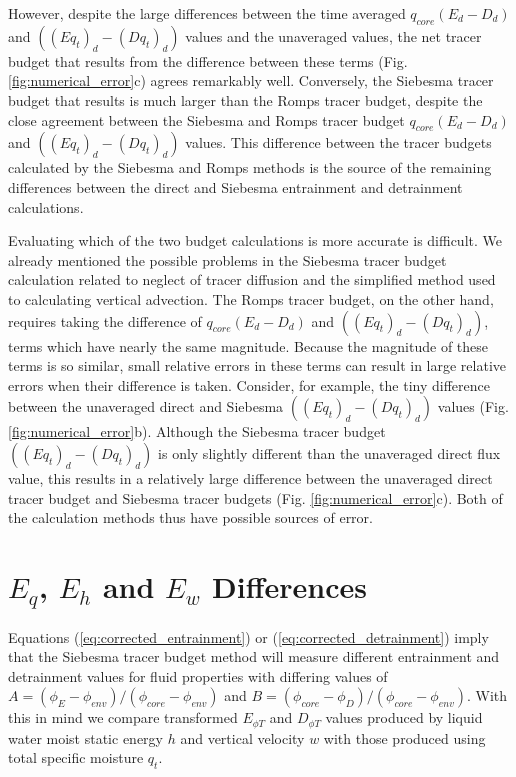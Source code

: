 \documentclass[12pt]{article}
\begin{document}
However, despite the large differences between the time averaged 
$q_{core}(E_d - D_d)$ and $((Eq_t)_d - (Dq_t)_d)$ values and the unaveraged
values, the net tracer budget that results from the difference
between these terms (Fig. \ref{fig:numerical_error}c) agrees remarkably 
well.  Conversely, the Siebesma tracer budget that results is much larger 
than the Romps tracer budget, despite the close agreement between the 
Siebesma and Romps tracer budget $q_{core}(E_d - D_d)$ and 
$((Eq_t)_d - (Dq_t)_d)$ values.  This difference between the tracer budgets
calculated by the Siebesma and Romps methods is the source of the remaining
differences between the direct and Siebesma entrainment and detrainment
calculations.

Evaluating which of the two budget calculations is more accurate is difficult.
We already mentioned the possible problems in the Siebesma tracer budget
calculation related to neglect of tracer diffusion and the simplified method 
used to calculating vertical advection.  The Romps tracer budget, on the other hand, requires taking the difference of $q_{core}(E_d - D_d)$ and 
$((Eq_t)_d - (Dq_t)_d)$, terms which have nearly the same magnitude.  
Because the magnitude of these terms is so similar, small relative errors in
these terms can result in large relative errors when their difference is taken.
Consider, for example, the tiny difference between the unaveraged direct and
Siebesma $((Eq_t)_d - (Dq_t)_d)$ values (Fig. \ref{fig:numerical_error}b).
Although the Siebesma tracer budget $((Eq_t)_d - (Dq_t)_d)$ is only slightly
different than the unaveraged direct flux value, this results in a relatively
large difference between the unaveraged direct tracer budget and Siebesma 
tracer budgets (Fig. \ref{fig:numerical_error}c).  Both of the calculation 
methods thus have possible sources of error.


\section{$E_q$, $E_h$ and $E_w$ Differences}

Equations (\ref{eq:corrected_entrainment}) or (\ref{eq:corrected_detrainment}) 
imply that the Siebesma tracer budget method will measure different entrainment
and detrainment values for fluid properties with differing values of 
$A = (\phi_E - \phi_{env})/(\phi_{core} - \phi_{env})$ and
$B = (\phi_{core} - \phi_D)/(\phi_{core} - \phi_{env})$.  With this in mind 
we compare transformed $E_{\phi T}$ and $D_{\phi T}$ values produced by liquid
water moist static energy $h$ and vertical velocity $w$ with those produced 
using total specific moisture $q_t$.
\end{document}

